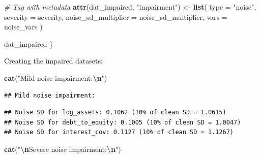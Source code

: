 \documentclass[
]{article}
\newenvironment{Shaded}{\begin{snugshade}}{\end{snugshade}}
\newcommand{\AttributeTok}[1]{\textcolor[rgb]{0.13,0.29,0.53}{#1}}
\newcommand{\CommentTok}[1]{\textcolor[rgb]{0.56,0.35,0.01}{\textit{#1}}}
\newcommand{\FunctionTok}[1]{\textcolor[rgb]{0.13,0.29,0.53}{\textbf{#1}}}
\newcommand{\NormalTok}[1]{#1}
\newcommand{\OtherTok}[1]{\textcolor[rgb]{0.56,0.35,0.01}{#1}}
\newcommand{\SpecialCharTok}[1]{\textcolor[rgb]{0.81,0.36,0.00}{\textbf{#1}}}
\newcommand{\StringTok}[1]{\textcolor[rgb]{0.31,0.60,0.02}{#1}}
\begin{document}
\begin{Shaded}
\begin{Highlighting}[]
  \CommentTok{\# Tag with metadata}
  \FunctionTok{attr}\NormalTok{(dat\_impaired, }\StringTok{"impairment"}\NormalTok{) }\OtherTok{\textless{}{-}} \FunctionTok{list}\NormalTok{(}
    \AttributeTok{type               =} \StringTok{"noise"}\NormalTok{,}
    \AttributeTok{severity           =}\NormalTok{ severity,}
    \AttributeTok{noise\_sd\_multiplier =}\NormalTok{ noise\_sd\_multiplier,}
    \AttributeTok{vars               =}\NormalTok{ noise\_vars}
\NormalTok{  )}
  
\NormalTok{  dat\_impaired}
\NormalTok{\}}
\end{Highlighting}
\end{Shaded}

Creating the impaired datasets:

\begin{Shaded}
\begin{Highlighting}[]
\FunctionTok{cat}\NormalTok{(}\StringTok{"Mild noise impairment:}\SpecialCharTok{\textbackslash{}n}\StringTok{"}\NormalTok{)}
\end{Highlighting}
\end{Shaded}

\begin{verbatim}
## Mild noise impairment:
\end{verbatim}

\begin{Shaded}
\end{Shaded}

\begin{verbatim}
## Noise SD for log_assets: 0.1062 (10% of clean SD = 1.0615)
## Noise SD for debt_to_equity: 0.1005 (10% of clean SD = 1.0047)
## Noise SD for interest_cov: 0.1127 (10% of clean SD = 1.1267)
\end{verbatim}

\begin{Shaded}
\begin{Highlighting}[]
\FunctionTok{cat}\NormalTok{(}\StringTok{"}\SpecialCharTok{\textbackslash{}n}\StringTok{Severe noise impairment:}\SpecialCharTok{\textbackslash{}n}\StringTok{"}\NormalTok{)}
\end{Highlighting}
\end{Shaded}
\end{document}
